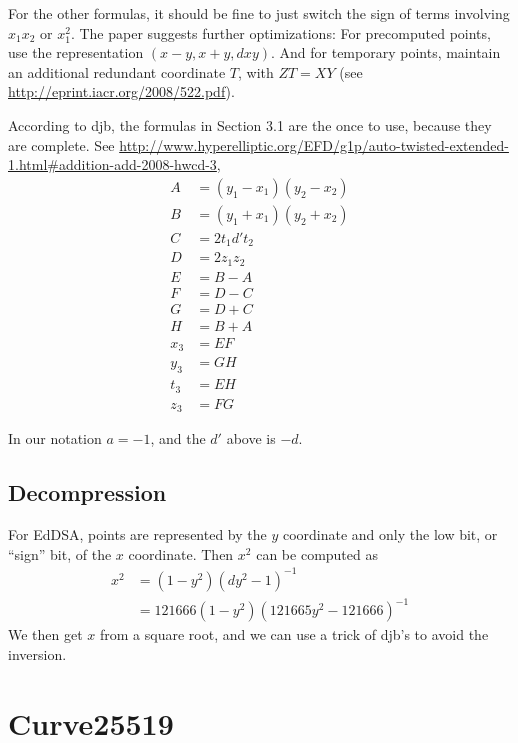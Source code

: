 \documentclass[a4paper]{article}
\begin{document}
For the other formulas, it should be fine to just switch the sign of
terms involving $x_1 x_2$ or $x_1^2$. The paper suggests further
optimizations: For precomputed points, use the representation $(x-y,
x+y, dxy)$. And for temporary points, maintain an additional redundant
coordinate $T$, with $Z T = X Y$ (see
\url{http://eprint.iacr.org/2008/522.pdf}).

According to djb, the formulas in Section 3.1 are the once to use,
because they are complete. See
\url{http://www.hyperelliptic.org/EFD/g1p/auto-twisted-extended-1.html#addition-add-2008-hwcd-3},
\begin{align*}
  A &= (y_1 - x_1)(y_2 - x_2) \\
  B &= (y_1 + x_1)(y_2 + x_2) \\
  C &= 2 t_1 d' t_2 \\
  D &= 2 z_1 z_2 \\
  E &= B - A \\
  F &= D - C \\
  G &= D + C \\
  H &= B + A \\
  x_3 &= E F \\
  y_3 &= G H \\
  t_3 &= E H \\
  z_3 &= F G
\end{align*}

In our notation $a = -1$, and the $d'$ above is $-d$.

\subsection{Decompression}

For EdDSA, points are represented by the $y$ coordinate and only the
low bit, or ``sign'' bit, of the $x$ coordinate. Then $x^2$ can be
computed as
\begin{align*}
  x^2 &= (1-y^2) (d y^2 - 1)^{-1} \\
  &= 121666 (1-y^2) (121665 y^2 - 121666)^{-1}
\end{align*}
We then get $x$ from a square root, and we can use a trick of djb's to
avoid the inversion.

\section{Curve25519}
\end{document}
